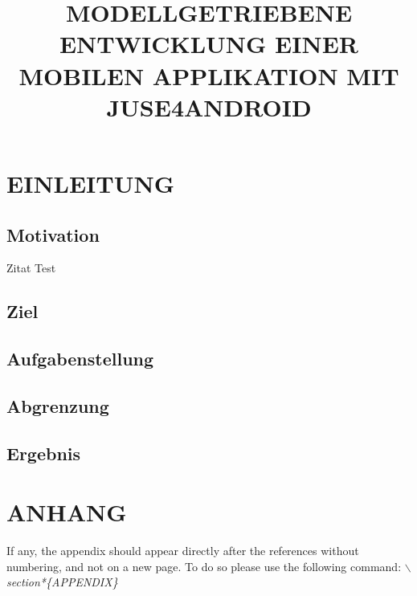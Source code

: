 \documentclass[a4paper,twoside]{article}
\begin{document}
\title{\uppercase{Modellgetriebene Entwicklung einer mobilen Applikation mit JUSE4Android}}

\author{
}




\onecolumn \maketitle \normalsize \vfill

\section{\uppercase{Einleitung}}
\label{sec:introduction}

\subsection{Motivation}
\noindent Zitat Test
\cite{SilvaMasterThesis}
\subsection{Ziel}
\noindent 

\subsection{Aufgabenstellung}
\noindent 


\subsection{Abgrenzung}

\subsection{Ergebnis}


\vfill

{\small
}


\section*{\uppercase{Anhang}}

\noindent If any, the appendix should appear directly after the
references without numbering, and not on a new page. To do so please use the following command:
\textit{$\backslash$section*\{APPENDIX\}}


\vfill
\end{document}
